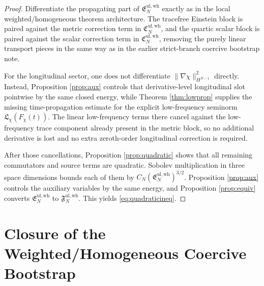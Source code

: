 \documentclass[11pt]{article}
\begin{document}
\begin{proof}
Differentiate the propagating part of \(\mathfrak E_N^{\mathrm{ul,wh}}\) exactly as in the local weighted/homogeneous theorem architecture. The tracefree Einstein block is paired against the metric correction term in \(\mathfrak C_N^{\mathrm{ul,wh}}\), and the quartic scalar block is paired against the scalar correction term in \(\mathfrak C_N^{\mathrm{ul,wh}}\), removing the purely linear transport pieces in the same way as in the earlier strict-branch coercive bootstrap note.

For the longitudinal sector, one does not differentiate \(\|\nabla\chi\|_{H^{N-1}}^2\) directly. Instead, Proposition \ref{prop:aux} controls that derivative-level longitudinal slot pointwise by the same closed energy, while Theorem \ref{thm:lowprop} supplies the missing time-propagation estimate for the explicit low-frequency seminorm \(\mathfrak L_\chi(F_\chi(t))\). The linear low-frequency terms there cancel against the low-frequency trace component already present in the metric block, so no additional derivative is lost and no extra zeroth-order longitudinal correction is required.

After those cancellations, Proposition \ref{prop:quadratic} shows that all remaining commutators and source terms are quadratic. Sobolev multiplication in three space dimensions bounds each of them by \(C_N(\mathfrak E_N^{\mathrm{ul,wh}})^{3/2}\). Proposition \ref{prop:aux} controls the auxiliary variables by the same energy, and Proposition \ref{prop:equiv} converts \(\mathfrak E_N^{\mathrm{ul,wh}}\) to \(\mathfrak F_N^{\mathrm{ul,wh}}\). This yields \eqref{eq:quadraticineq}.
\end{proof}

\section{Closure of the Weighted/Homogeneous Coercive Bootstrap}
\end{document}
